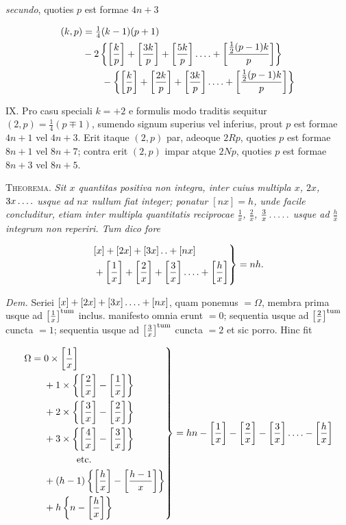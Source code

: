 \emph{secundo}, quoties $p$ est formae $4n+3$

\[
\begin{aligned}
(k,p)&=\tfrac14(k-1)(p+1)\\
& -2\left\{\left[\frac{k}{p}\right]+\left[\frac{3k}{p}\right]+\left[\frac{5k}{p}\right]\mathinner{.\,.\,.\,.}+\left[\frac{\frac12(p-1)k}{p}\right]\right\}\\
&\qquad-\left\{\left[\frac{k}{p}\right]+\left[\frac{2k}{p}\right]+\left[\frac{3k}{p}\right]\mathinner{.\,.\,.\,.}+\left[\frac{\frac12(p-1)k}{p}\right]\right\}
\end{aligned}
\]

IX.  Pro casu speciali $k=+2$ e formulis modo traditis sequitur $(2,p)=\tfrac14(p\mp1)$, sumendo signum superius vel inferius, prout $p$ est formae $4n+1$ vel $4n+3$.  Erit itaque $(2,p)$ par, adeoque $2Rp$, quoties $p$ est formae $8n+1$ vel $8n+7$; contra erit $(2,p)$ impar atque $2Np$, quoties $p$ est formae $8n+3$ vel $8n+5$.

%

\textsc{Theorema.}  \emph{Sit $x$ quantitas positiva non integra, inter cuius multipla $x$, $2x$,} \emph{$3x\mathinner{.\,.\,.\,.}$ usque ad $nx$ nullum fiat integer; ponatur $[nx]=h$, unde facile concluditur,} \emph{etiam inter multipla quantitatis reciprocae $\frac1x$, $\frac2x$, $\frac3x\mathinner{.\,.\,.\,.\,.}$ usque ad $\frac hx$ integrum non} \emph{reperiri.  Tum dico fore}

\[
\begin{aligned}
\left.\begin{aligned}
&[x]+[2x]+[3x]\mathinner{.\,.}+[nx]\\
&+\left[\frac1x\right]+\left[\frac2x\right]+\left[\frac3x\right]\mathinner{.\,.\,.\,.}+\left[\frac hx\right]
\end{aligned}\right\}=nh.
\end{aligned}
\]

\emph{Dem.}  Seriei $[x]+[2x]+[3x]\mathinner{.\,.\,.\,.}+[nx]$, quam ponemus $=\Omega$, membra prima usque ad $\left[\frac1x\right]^{\mathrm{tum}}$ inclus. manifesto omnia erunt $=0$; sequentia usque ad $\left[\frac2x\right]^{\mathrm{tum}}$ cuncta $=1$; sequentia usque ad $\left[\frac3x\right]^{\mathrm{tum}}$ cuncta $=2$ et sic porro. Hinc fit

\[
\begin{aligned}
\left.\begin{aligned}
\Omega={}&0\times\gbr{\frac1x}\\
&+1\times\left\{\gbr{\frac2x}-\gbr{\frac1x}\right\}\\
&+2\times\left\{\gbr{\frac3x}-\gbr{\frac2x}\right\}\\
&+3\times\left\{\gbr{\frac4x}-\gbr{\frac3x}\right\}\\
&\hspace{12mm}\text{etc.}\\
&+(h-1)\left\{\gbr{\frac hx}-\gbr{\frac{h-1}{x}}\right\}\\
&+h\left\{n-\gbr{\frac hx}\right\}
\end{aligned}\right\}=hn-\gbr{\frac1x}-\gbr{\frac2x}-\gbr{\frac3x}\dotsfour-\gbr{\frac hx}
\end{aligned}
\]

